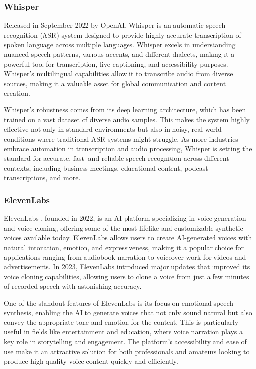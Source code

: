 \subsubsection{Whisper}

Released in September 2022 by OpenAI, Whisper \cite{graham2024evaluating} is an automatic speech recognition (ASR) system designed to provide highly accurate transcription of spoken language across multiple languages. 
Whisper excels in understanding nuanced speech patterns, various accents, and different dialects, making it a powerful tool for transcription, live captioning, and accessibility purposes. 
Whisper’s multilingual capabilities allow it to transcribe audio from diverse sources, making it a valuable asset for global communication and content creation.

Whisper’s robustness comes from its deep learning architecture, which has been trained on a vast dataset of diverse audio samples. 
This makes the system highly effective not only in standard environments but also in noisy, real-world conditions where traditional ASR systems might struggle. 
As more industries embrace automation in transcription and audio processing, Whisper is setting the standard for accurate, fast, and reliable speech recognition across different contexts, including business meetings, educational content, podcast transcriptions, and more.

\subsubsection{ElevenLabs}

ElevenLabs \cite{dewatri2023potential}, founded in 2022, is an AI platform specializing in voice generation and voice cloning, offering some of the most lifelike and customizable synthetic voices available today. 
ElevenLabs allows users to create AI-generated voices with natural intonation, emotion, and expressiveness, making it a popular choice for applications ranging from audiobook narration to voiceover work for videos and advertisements. 
In 2023, ElevenLabs introduced major updates that improved its voice cloning capabilities, allowing users to clone a voice from just a few minutes of recorded speech with astonishing accuracy.

One of the standout features of ElevenLabs is its focus on emotional speech synthesis, enabling the AI to generate voices that not only sound natural but also convey the appropriate tone and emotion for the content. 
This is particularly useful in fields like entertainment and education, where voice narration plays a key role in storytelling and engagement. 
The platform’s accessibility and ease of use make it an attractive solution for both professionals and amateurs looking to produce high-quality voice content quickly and efficiently.

